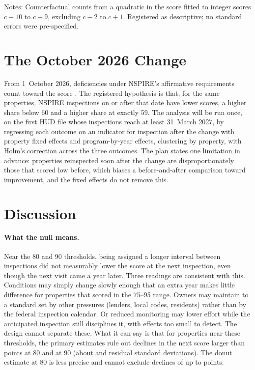 \documentclass[11pt,letterpaper]{article}
\begin{document}
\begin{table}[t]
\centering\small
\caption{Observed and counterfactual counts around thresholds, UPCS 2013--2019}\label{tab:thresholds}

\par\vspace{0.5ex}\footnotesize\raggedright Notes: Counterfactual counts from a quadratic in the score fitted to integer scores $c-10$ to $c+9$, excluding $c-2$ to $c+1$. Registered as descriptive; no standard errors were pre-specified.
\end{table}

\section{The October 2026 Change}\label{sec:h3}
From 1~October 2026, deficiencies under NSPIRE's affirmative requirements count toward the score \citep{fr2026}. The registered hypothesis is that, for the same properties, NSPIRE inspections on or after that date have lower scores, a higher share below 60 and a higher share at exactly 59. The analysis will be run once, on the first HUD file whose inspections reach at least 31~March 2027, by regressing each outcome on an indicator for inspection after the change with property fixed effects and program-by-year effects, clustering by property, with Holm's correction across the three outcomes. The plan states one limitation in advance: properties reinspected soon after the change are disproportionately those that scored low before, which biases a before-and-after comparison toward improvement, and the fixed effects do not remove this.

\section{Discussion}\label{sec:discussion}
\paragraph{What the null means.} Near the 80 and 90 thresholds, being assigned a longer interval between inspections did not measurably lower the score at the next inspection, even though the next visit came a year later. Three readings are consistent with this. Conditions may simply change slowly enough that an extra year makes little difference for properties that scored in the 75--95 range. Owners may maintain to a standard set by other pressures (lenders, local codes, residents) rather than by the federal inspection calendar. Or reduced monitoring may lower effort while the anticipated inspection still disciplines it, with effects too small to detect. The design cannot separate these. What it can say is that for properties near these thresholds, the primary estimates rule out declines in the next score larger than \ciLoEighty{} points at 80 and \ciLoNinety{} at 90 (about \ciLoSdEighty{} and \ciLoSdNinety{} residual standard deviations). The donut estimate at 80 is less precise and cannot exclude declines of up to \robDonutOneCiLoEighty{} points.
\end{document}
